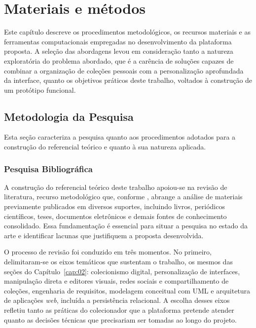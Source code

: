 \chapter{Materiais e métodos}
\label{cap:03}

Este capítulo descreve os procedimentos metodológicos, os recursos materiais e as ferramentas computacionais empregadas no desenvolvimento da plataforma proposta. A seleção das abordagens levou em consideração tanto a natureza exploratória do problema abordado, que é a carência de soluções capazes de combinar a organização de coleções pessoais com a personalização aprofundada da interface, quanto os objetivos práticos deste trabalho, voltados à construção de um protótipo funcional.

\section{Metodologia da Pesquisa}

Esta seção caracteriza a pesquisa quanto aos procedimentos adotados para a construção do referencial teórico e quanto à sua natureza aplicada.

\subsection{Pesquisa Bibliográfica}

A construção do referencial teórico deste trabalho apoiou-se na revisão de literatura, recurso metodológico que, conforme \cite{fontelles2009}, abrange a análise de materiais previamente publicados em diversos suportes, incluindo livros, periódicos científicos, teses, documentos eletrônicos e demais fontes de conhecimento consolidado. Essa fundamentação é essencial para situar a pesquisa no estado da arte e identificar lacunas que justifiquem a proposta desenvolvida.

O processo de revisão foi conduzido em três momentos. No primeiro, delimitaram-se os eixos temáticos que sustentam o trabalho, os mesmos das seções do Capítulo~\ref{cap:02}: colecionismo digital, personalização de interfaces, manipulação direta e editores visuais, redes sociais e compartilhamento de coleções, engenharia de requisitos, modelagem conceitual com UML e arquitetura de aplicações \textit{web}, incluída a persistência relacional. A escolha desses eixos refletiu tanto as práticas do colecionador que a plataforma pretende atender quanto as decisões técnicas que precisariam ser tomadas ao longo do projeto.

